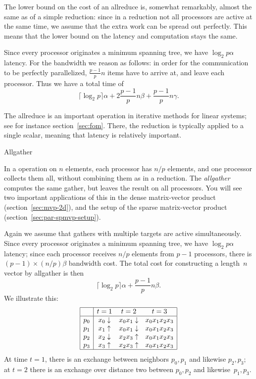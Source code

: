 The lower bound on the cost of an allreduce is, somewhat remarkably,
almost the same as of a simple reduction: since in a reduction not all
processors are active at the same time, we assume that the extra work
can be spread out perfectly. This means that the lower bound on the
latency and computation stays the same.

Since every processor originates a
minimum spanning tree, we have $\log_2p\alpha$ latency.
For the bandwidth we reason as
follows: in order for the communication to be perfectly parallelized,
$\frac{p-1}p n$ items have to arrive at, and leave each
processor. Thus we have a total time of
\[ \lceil \log_2 p\rceil\alpha +2\frac{p-1}pn\beta
    +\frac{p-1}pn\gamma. \]

The allreduce is an important operation in iterative methods for linear systems;
see for instance section~\ref{sec:fom}.
There, the reduction is typically applied to a single scalar,
meaning that latency is relatively important.


 {Allgather}

In a  operation on $n$ elements, each processor has
$n/p$ elements, and one processor collects them all, without combining
them as in a reduction. The \emph{allgather} computes the same gather,
but leaves the result on all processors.
You will see two important applications of this
in the dense matrix-vector product (section~\ref{sec:mvp-2d}),
and the setup of the sparse matrix-vector product
(section~\ref{sec:par-spmvp-setup}).

Again we assume that gathers with multiple targets are active simultaneously.
Since every processor originates a
minimum spanning tree, we have $\log_2p\alpha$ latency;
since each processor receives $n/p$ elements from $p-1$ processors,
there is $(p-1)\times(n/p)\beta$ bandwidth cost.
The total cost for constructing a
length~$n$ vector by allgather is then
\[ \lceil \log_2 p\rceil\alpha +\frac{p-1}pn\beta. \]
We illustrate this:
\[
\begin{array}{|c|ccc|}
\hline
  &t=1&t=2&t=3\\ \hline
p_0&x_0\downarrow&x_0x_1\downarrow&x_0x_1x_2x_3\\
p_1&x_1\uparrow&x_0x_1\downarrow&x_0x_1x_2x_3\\
p_2&x_2\downarrow&x_2x_3\uparrow&x_0x_1x_2x_3\\
p_3&x_3\uparrow&x_2x_3\uparrow&x_0x_1x_2x_3\\
\hline
\end{array}
\]
At time $t=1$, there is an exchange between neighbors $p_0,p_1$ and
likewise $p_2,p_3$; at $t=2$ there is an exchange over distance two
between $p_0,p_2$ and likewise~$p_1,p_3$.

